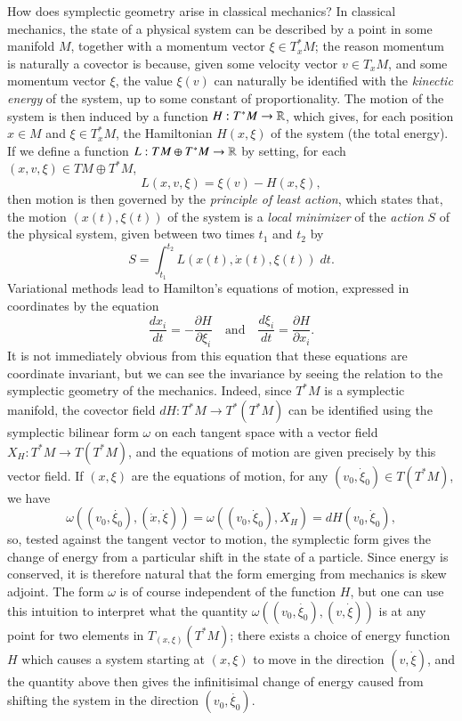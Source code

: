 How does symplectic geometry arise in classical mechanics? In classical mechanics, the state of a physical system can be described by a point in some manifold $M$, together with a momentum vector $\xi \in T^*_x M$; the reason momentum is naturally a covector is because, given some velocity vector $v \in T_xM$, and some momentum vector $\xi$, the value $\xi(v)$ can naturally be identified with the \emph{kinectic energy} of the system, up to some constant of proportionality. The motion of the system is then induced by a function $H: T^* M \to \operatorname{\mathbb{R}}$, which gives, for each position $x \in M$ and $\xi \in T^*_xM$, the Hamiltonian $H(x,\xi)$ of the system (the total energy). If we define a function $L: TM \oplus T^*M \to \operatorname{\mathbb{R}}$ by setting, for each $(x,v,\xi) \in TM \oplus T^*M$,
%
\[ L(x,v,\xi) = \xi(v) - H(x,\xi), \]
%
then motion is then governed by the \emph{principle of least action}, which states that, the motion $(x(t), \xi(t))$ of the system is a \emph{local minimizer} of the \emph{action} $S$ of the physical system, given between two times $t_1$ and $t_2$ by
%
\[ S = \int_{t_1}^{t_2} L(x(t), \dot{x}(t), \xi(t))\; dt. \]
%
Variational methods lead to Hamilton's equations of motion, expressed in coordinates by the equation
%
\[ \frac{dx_i}{dt} = - \frac{\partial H}{\partial \xi_i} \quad\text{and}\quad \frac{d\xi_i}{dt} = \frac{\partial H}{\partial x_i}. \]
%
It is not immediately obvious from this equation that these equations are coordinate invariant, but we can see the invariance by seeing the relation to the symplectic geometry of the mechanics. Indeed, since $T^* M$ is a symplectic manifold, the covector field $dH: T^* M \to T^*(T^* M)$ can be identified using the symplectic bilinear form $\omega$ on each tangent space with a vector field $X_H: T^* M \to T(T^* M)$, and the equations of motion are given precisely by this vector field. If $(x,\xi)$ are the equations of motion, for any $(v_0,\dot{\xi}_0) \in T(T^*M)$, we have
%
\[ \omega( (v_0,\dot{\xi_0}), (\dot{x}, \dot{\xi}) ) = \omega((v_0,\dot{\xi}_0), X_H) = dH(v_0, \dot{\xi}_0), \]
%
so, tested against the tangent vector to motion, the symplectic form gives the change of energy from a particular shift in the state of a particle. Since energy is conserved, it is therefore natural that the form emerging from mechanics is skew adjoint. The form $\omega$ is of course independent of the function $H$, but one can use this intuition to interpret what the quantity $\omega((v_0,\dot{\xi_0}), (v,\dot{\xi}))$ is at any point for two elements in $T_{(x,\xi)}(T^* M)$; there exists a choice of energy function $H$ which causes a system starting at $(x,\xi)$ to move in the direction $(v,\dot{\xi})$, and the quantity above then gives the infinitisimal change of energy caused from shifting the system in the direction $(v_0,\dot{\xi_0})$.


